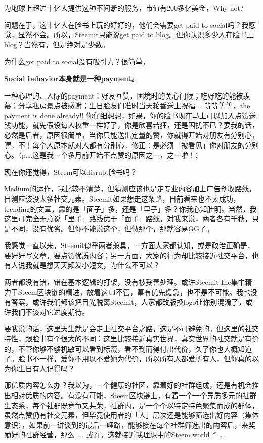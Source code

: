 \documentclass[]{ctexbook}
\begin{document}
为地球上超过十亿人提供这种不间断的服务，市值有200多亿美金，Why not?

问题在于，这十亿人在脸书上玩的好好的，他们会需要get paid to social吗？我感觉，显然不会。所以，Steemit只能说get paid to blog。但你认识多少人在脸书上blog？当然有，但是绝对是少数。

为什么get paid to social没有吸引力？很简单，

\textbf{Social behavior本身就是一种payment。}

一种心理的、人际的payment：好友互赞，困境时的关心问候；吃好吃的能被羡慕；分享私房景点被感谢；生日脸友们准时当天轮番送上祝福 \ldots{} 等等等等，the payment is done already!! 你仔细想想，如果，你的脸书现在马上可以加入点赞送钱功能，就先假设每人权重一样好了，你是欣喜若狂，还是困扰不已？要我的话，必然是后者，原因很简单，当你只能送出定量的赞，你就得开始对朋友有分别心，喔，不！每个人原本就对人都有分别心，修正：是必须「被看见」你对朋友的分别心。（p.s.这是我一个多月前开始不点赞的原因之一，之一啦！）

现在你还觉得，Steem可以disrupt脸书吗？

Medium的运作，我比较不清楚，但猜测应该也是走专业内容加上广告创收路线，目测应该没太多社交元素。Steemit如果想走这条路，目前看来也不太成功，trending的文章，靠的是「面子」多，还是「里子」多？你我心知肚明。当然，我这里可完全无意说「里子」路线优于「面子」路线，对我来说，两者各有千秋，只是不同，没有优劣。但你不能说这个，但做那个，那就容易GG了。

我感觉一直以来，Steemit似乎两者兼具，一方面大家都认知，或是政治正确是，要好好写文章，要点赞优质内容；另一方面，大家的行为却比较接近社交平台，也有人说我就是想天天频发小短文，为什么不可以？

两者都没有错，错在基本逻辑的打架，没有被妥善处理。或许Steemit Inc集中精力于Steem区块链的精进，放着这UI不管，事有优先缓急，也不是不可能。我也没有答案，或许我们都该把目光脱离Steemit，人家都改版换logo让你别混淆了，或许我们不该对它过度期待。

要我说的话，这里天生就是会走上社交平台之路，这是不可避免的。但这里的社交特性，跟脸书有个很大的不同：这里比较接近真实世界，真实世界的社交就是有价的，不管你够不够机敏可以看到标籤，看不到而得付出代价，久了你也大概知道了。脸书不一样，爱你不用以不爱她为代价，所以所有人都爱所有人，但你真的以为你生日有人记得吗？

那优质内容怎么办？我以为，一个健康的社区，靠着好的社群组成，还是有机会推出相对优质的内容。有没有可能，Steem区块链上，有着一个一个异质多元的社群生态系，每个社群既竞争又共荣，社群内，是一个个以特定特色聚集而成的群体，虽然点赞仍有社交元素，但毕竟使用者的「人」层次还是能够筛选出好内容（集体意识），如果前一讲谈到的最后一哩路，能够接在每个社群筛选出的内容后，来奖励好的社群经营，那么 \ldots{}. 或许，这就接近我理想中的Steem world了 \ldots{}
\end{document}
